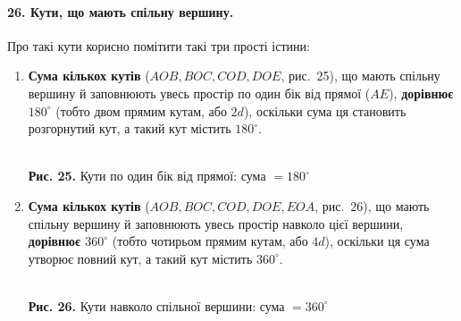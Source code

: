 \paragraph{26. Кути, що мають спільну вершину.}
Про такі кути корисно помітити такі три прості істини:
\begin{enumerate}
    \item \textbf{Сума кількох кутів} ($AOB, BOC, COD, DOE$, рис.~25), що мають спільну вершину й заповнюють увесь простір по один бік від прямої ($AE$), \textbf{дорівнює $180^\circ$} (тобто двом прямим кутам, або $2d$), оскільки сума ця становить розгорнутий кут, а такий кут містить $180^\circ$.
    
    \begin{center}
    \\[4pt]
    {\small\textbf{Рис. 25.} Кути по один бік від прямої: сума $= 180^\circ$}
    \end{center}

    \item \textbf{Сума кількох кутів} ($AOB, BOC, COD, DOE, EOA$, рис.~26), що мають спільну вершину й заповнюють увесь простір навколо цієї вершини, \textbf{дорівнює $360^\circ$} (тобто чотирьом прямим кутам, або $4d$), оскільки ця сума утворює повний кут, а такий кут містить $360^\circ$.
    
    \begin{center}
    \\[4pt]
    {\small\textbf{Рис. 26.} Кути навколо спільної вершини: сума $= 360^\circ$}
    \end{center}


\end{enumerate}

